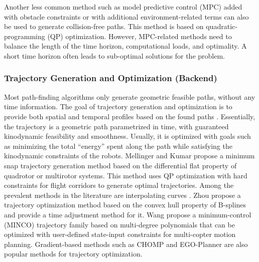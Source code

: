\documentclass[letterpaper,journal,twoside]{IEEEtran}
\begin{document}
Another less common method such as model predictive 
control (MPC) added with obstacle constraints or with 
additional environment-related 
terms \cite{park2009obstacle,ji2016path}  can also be 
used to generate collision-free paths. This method is based on 
quadratic-programming (QP) optimization. 
However, MPC-related methods need to balance the 
length of the time horizon, computational loads, and 
optimality. A short time horizon often leads to 
sub-optimal solutions for the problem.




\subsubsection{Trajectory Generation and Optimization (Backend)}
Most path-finding algorithms only generate geometric 
feasible paths, without any time information. 
The goal of trajectory generation and optimization is to 
provide both spatial and temporal profiles based on the 
found paths \cite{quan2020survey}. 
Essentially, the trajectory is a geometric path parametrized 
in time, with guaranteed kinodynamic feasibility and smoothness.
Usually, it is optimized with goals such as minimizing the 
total ``energy'' spent along the path while satisfying the 
kinodynamic constraints of the robots.
Mellinger and Kumar \cite{mellinger2011minimum} propose 
a minimum snap trajectory generation method based on the 
differential flat property of quadrotor or multirotor 
systems. 
This method uses QP optimization with 
hard constraints for flight corridors to generate optimal 
trajectories. 
Among the prevalent methods in the literature are 
interpolating curves \cite{dong2023review}.
Zhou \etal \cite{zhou2019robust} propose a trajectory 
optimization method based on the convex hull property of 
B-splines and provide a time adjustment method for it.
Wang \etal \cite{wang2022geometrically} propose a 
minimum-control (MINCO) trajectory family based on 
multi-degree polynomials that can be 
optimized with user-defined state-input constraints for 
multi-copter motion planning.
Gradient-based methods such as
CHOMP \cite{ratliff2009chomp} and 
EGO-Planner \cite{zhou2020ego} are also popular methods 
for trajectory optimization.
\end{document}

